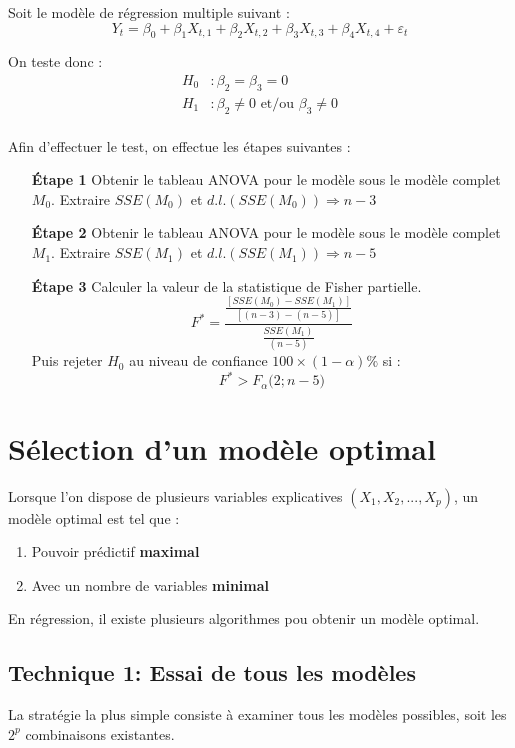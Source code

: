 \documentclass[11pt,french]{report}
\begin{document}
Soit le modèle de régression multiple suivant :
$$
Y_t = \beta_0 + \beta_1X_{t,1} + \beta_2X_{t,2} + \beta_3X_{t,3} + \beta_4X_{t,4} + \varepsilon_t
$$

On teste donc :
\begin{align*}
H_0 &: \beta_2 = \beta_3 = 0 \\
H_1 &: \beta_2 \neq 0 \text{ et/ou } \beta_3 \neq 0 \\
\end{align*}

Afin d'effectuer le test, on effectue les étapes suivantes :
\begin{itemize}
\item[\textbf{Étape 1}] Obtenir le tableau ANOVA pour le modèle sous le modèle complet $M_0$. Extraire $SSE(M_0)$ et $d.l.(SSE(M_0)) \Rightarrow n - 3$

\item[\textbf{Étape 2}] Obtenir le tableau ANOVA pour le modèle sous le modèle complet $M_1$. Extraire $SSE(M_1)$ et $d.l.(SSE(M_1)) \Rightarrow n - 5$ 

\item[\textbf{Étape 3}] Calculer la valeur de la statistique de Fisher partielle.
$$
F^* = \frac{\frac{[SSE(M_0) - SSE(M_1)]}{[(n-3) - (n-5)]}}{\frac{SSE(M_1)}{(n-5)}}
$$
Puis rejeter $H_0$ au niveau de confiance $100 \times (1 - \alpha)\%$ si :
$$
F^* > F_{\alpha}\Big( 2; n-5 \Big)
$$
\end{itemize}

\section{Sélection d'un modèle optimal}
\label{sec:optimal}
Lorsque l'on dispose de plusieurs variables explicatives $(X_1,X_2,...,X_p)$, un modèle optimal est tel que :
\begin{enumerate}
\item Pouvoir prédictif \textbf{maximal}
\item Avec un nombre de variables \textbf{minimal}
\end{enumerate}

En régression, il existe plusieurs algorithmes pou obtenir un modèle optimal.

\subsection{Technique 1: Essai de tous les modèles}
\label{tech1}

La stratégie la plus simple consiste à examiner tous les modèles possibles, soit les $2^p$ combinaisons existantes. \newline
\end{document}
